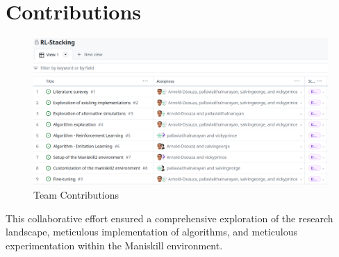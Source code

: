 \documentclass[../report.tex]{subfiles}
\begin{document}
    \section{Contributions}
    \begin{figure}
        \centering
        \includegraphics[width=1\linewidth]{team work.png}
        \caption{Team Contributions}
        \label{fig:enter-label}
    \end{figure}
    
    This collaborative effort ensured a comprehensive exploration of the research landscape, meticulous implementation of algorithms, and meticulous experimentation within the Maniskill environment.
\end{document}
